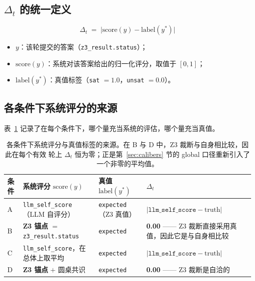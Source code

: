\documentclass{article}
\begin{document}
\setcounter{table}{0}
\renewcommand{\thetable}{D.\arabic{table}}

\subsection{$\Delta_t$ 的统一定义}

\[
  \Delta_t \;=\; \bigl| \text{score}(y) - \text{label}(y^{*}) \bigr|
\]

\begin{itemize}
  \item $y$：该轮提交的答案（\texttt{z3\_result.status}）；
  \item $\text{score}(y)$：系统对该答案给出的归一化评分，取值于 $[0, 1]$；
  \item $\text{label}(y^{*})$：真值标签（\texttt{sat} $= 1.0$，\texttt{unsat} $= 0.0$）。
\end{itemize}

\subsection{各条件下系统评分的来源}

表~\ref{tab:table2c_sources} 记录了在每个条件下，哪个量充当系统的评估，哪个量充当真值。

\begin{table}[t]
  \centering
  \caption{各条件下系统评分与真值标签的来源。在 B 与 D 中，Z3 裁断与自身相比较，因此在每个有效
  轮上 $\Delta_t$ 恒为零；正是第~\ref{sec:calibers} 节的 global 口径重新引入了一个非零的平均值。}
  \label{tab:table2c_sources}
  \small
  \begin{tabularx}{\textwidth}{@{}l l l >{\raggedright\arraybackslash}X@{}}
    \toprule
    条件 & 系统评分 $\text{score}(y)$ & 真值 $\text{label}(y^{*})$ & $\Delta_t$ \\
    \midrule
    A & \texttt{llm\_self\_score}（LLM 自评分） & \texttt{expected}（Z3 真值） &
        $\bigl|\texttt{llm\_self\_score} - \text{truth}\bigr|$ \\
    B & \textbf{Z3 锚点} $=$ \texttt{z3\_result.status} & \texttt{expected} &
        \textbf{0.00} —— Z3 裁断直接采用真值，因此它是与自身相比较 \\
    C & \texttt{llm\_self\_score}，在总体上取平均 & \texttt{expected} &
        $\bigl|\texttt{llm\_self\_score} - \text{truth}\bigr|$ \\
    D & \textbf{Z3 锚点} $+$ 圆桌共识 & \texttt{expected} &
        \textbf{0.00} —— Z3 裁断是自洽的 \\
    \bottomrule
  \end{tabularx}
\end{table}
\end{document}
